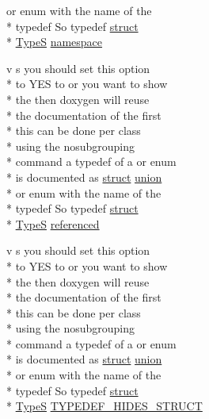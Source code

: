 \begin{DoxyCompactItemize}
or enum with the name of the \\*
typedef So typedef \hyperlink{mkdoc_8dox_aba655c5729da86df745f0c8e7f9ba8d2}{struct} \\*
\hyperlink{mkdoc_8dox_a25dd1c015abaf1e4f2c6879012f4f170}{Type\-S} \hyperlink{mkdoc_8dox_a525af27f938795208a10ce5261c76978}{namespace}
\item 
v s you should set this option \\*
to Y\-E\-S to or you want to show \\*
the then doxygen will reuse \\*
the documentation of the first \\*
this can be done per class \\*
using the nosubgrouping \\*
command a typedef of a or enum \\*
is documented as \hyperlink{mkdoc_8dox_aba655c5729da86df745f0c8e7f9ba8d2}{struct} \hyperlink{mkdoc_8dox_a68000add3c95d09ceb97c3079515907d}{union} \\*
or enum with the name of the \\*
typedef So typedef \hyperlink{mkdoc_8dox_aba655c5729da86df745f0c8e7f9ba8d2}{struct} \\*
\hyperlink{mkdoc_8dox_a25dd1c015abaf1e4f2c6879012f4f170}{Type\-S} \hyperlink{mkdoc_8dox_ac263f06ace5c014824e336d270a831d2}{referenced}
\item 
v s you should set this option \\*
to Y\-E\-S to or you want to show \\*
the then doxygen will reuse \\*
the documentation of the first \\*
this can be done per class \\*
using the nosubgrouping \\*
command a typedef of a or enum \\*
is documented as \hyperlink{mkdoc_8dox_aba655c5729da86df745f0c8e7f9ba8d2}{struct} \hyperlink{mkdoc_8dox_a68000add3c95d09ceb97c3079515907d}{union} \\*
or enum with the name of the \\*
typedef So typedef \hyperlink{mkdoc_8dox_aba655c5729da86df745f0c8e7f9ba8d2}{struct} \\*
\hyperlink{mkdoc_8dox_a25dd1c015abaf1e4f2c6879012f4f170}{Type\-S} \hyperlink{mkdoc_8dox_a588f1527029611acb900d62c540e1007}{T\-Y\-P\-E\-D\-E\-F\-\_\-\-H\-I\-D\-E\-S\-\_\-\-S\-T\-R\-U\-C\-T}
\item 

\end{DoxyCompactItemize}
